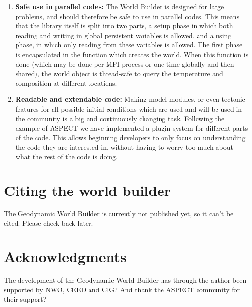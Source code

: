 \documentclass{book}
\newcommand{\GWB}{{Geodynamic World Builder}}
\newcommand{\WB}{{World Builder}}
\newcommand{\aspect}{{ASPECT}}
\begin{document}
\begin{enumerate}
\begin{itemize}
        \item {\bf Version numbering: } When a problem can't be solved in a backwards compatible way, we will make use of the version system. To this end we use Semantic Versioning 2.0.0 (\url{https://semver.org/spec/v2.0.0.html}). This means that from version 1.0.0, every change to the code which is backwards incompatible with the input file or the interface we provide, we will increase the major version. We require every \WB{} input file to contain the current major version number. This way it is always clear what version of the code was used to produce the model.
    \end{itemize}
    \item {\bf Safe use in parallel codes:} The \WB{} is designed for large problems, and should therefore be safe to use in parallel codes. This means that the library itself is split into two parts, a setup phase in which both reading and writing in global persistent variables is allowed, and a using phase, in which only reading from these variables is allowed. The first phase is encapsulated in the function which creates the world. When this function is done (which may be done per MPI process or one time globally and then shared), the world object is thread-safe to query the temperature and composition at different locations.
    \item {\bf Readable and extendable code:} Making model modules, or even tectonic features for all possible initial conditions which are used and will be used in the community is a big and continuously changing task. Following the example of \aspect{} we have implemented a plugin system for different parts of the code. This allows beginning developers to only focus on understanding the code they are interested in, without having to worry too much about what the rest of the code is doing. 
\end{enumerate}

\section{Citing the world builder}
The \GWB{} is currently not published yet, so it can't be cited. Please check back later.
\section{Acknowledgments}
The development of the \GWB{} has through the author been supported by NWO, CEED and CIG? And thank the ASPECT community for their support?
\end{document}
